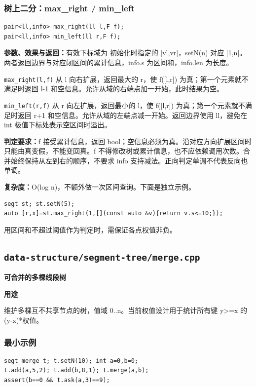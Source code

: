 \documentclass[UTF8,a4paper,10pt]{ctexart}
\newcommand{\TemplUsage}[1]{\textbf{用途}\par #1\par}
\begin{document}
\noindent\begin{minipage}{\textwidth}
\subsubsection*{树上二分：max\_right / min\_left}
\begin{lstlisting}
pair<ll,info> max_right(ll l,F f);
pair<ll,info> min_left(ll r,F f);
\end{lstlisting}
\textbf{参数、效果与返回：}有效下标域为 初始化时指定的 [vl,vr]，setN(n) 对应 [1,n]。两者返回边界与对应闭区间的累计信息，info.s 为区间和，info.len 为长度。

\texttt{max\_right(l,f)} 从 l 向右扩展，返回最大的 r，使 f([l,r]) 为真；第一个元素就不满足时返回 l-1 和空信息。允许从域的右端点加一开始，此时结果为空。

\texttt{min\_left(r,f)} 从 r 向左扩展，返回最小的 l，使 f([l,r]) 为真；第一个元素就不满足时返回 r+1 和空信息。允许从域的左端点减一开始。返回边界使用 ll，避免在 int 极值下标处表示空区间时溢出。

\textbf{判定要求：}f 接受累计信息，返回 bool；空信息必须为真。沿对应方向扩展区间时只能由真变假，不能变回真。f 不得修改树或累计信息，也不应依赖调用次数。合并始终保持从左到右的顺序，不要求 info 支持减法。正向判定单调不代表反向也单调。

\textbf{复杂度：}O(log n)，不额外做一次区间查询。下面是独立示例。
\begin{lstlisting}
segt st; st.setN(5);
auto [r,x]=st.max_right(1,[](const auto &v){return v.s<=10;});
\end{lstlisting}
用区间和不超过阈值作为判定时，需保证各点权值非负。
\end{minipage}\par
\clearpage
\subsection{\texttt{data-structure/segment-tree/merge.cpp}}
\textbf{可合并的多棵线段树}\par
\TemplUsage{维护多棵互不共享节点的树，值域 0..n。当前权值设计用于统计所有键 y>=x 的 (y-x)*权值。}
\subsubsection*{最小示例}
\begin{lstlisting}
segt_merge t; t.setN(10); int a=0,b=0;
t.add(a,5,2); t.add(b,8,1); t.merge(a,b);
assert(b==0 && t.ask(a,3)==9);
\end{lstlisting}
\end{document}

